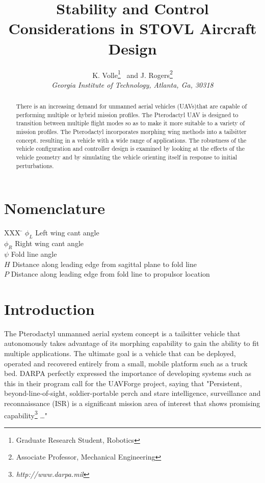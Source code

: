 \documentclass[]{aiaa-tc}%
\title{Stability and Control Considerations in STOVL Aircraft Design}
\author{
  K. Volle\footnote{Graduate Research Student, Robotics}%
  \ and J. Rogers\footnote{Associate Professor, Mechanical Engineering}\\%
  {\normalsize\itshape
   Georgia Institute of Technology, Atlanta, Ga, 30318}\\
 }
\begin{document}
\maketitle

\begin{abstract}
There is an increasing demand for unmanned aerial vehicles (UAVs)that are capable of performing multiple or hybrid mission profiles.  The Pterodactyl UAV is designed to transition between multiple flight modes so as to make it more suitable to a variety of mission profiles. The Pterodactyl incorporates morphing wing methods into a tailsitter concept. resulting in a vehicle with a wide range of applications. The robustness of the vehicle configuration and controller design is examined by looking at the effects of the vehicle geometry and by simulating the vehicle orienting itself in response to initial perturbations.
\end{abstract}

\section*{Nomenclature}



\begin{tabbing}
  XXX \= \kill%
\centering
  $ \phi_{L} $ \> Left wing cant angle \\
  $ \phi_{R} $ \> Right wing cant angle \\
  $ \psi $ \> Fold line angle \\
  $ H $ \> Distance along leading edge from sagittal plane to fold line  \\
  $ P $ \> Distance along leading edge from fold line to propulsor location \\

 \end{tabbing}
\section{Introduction}

The Pterodactyl unmanned aerial system concept is a tailsitter \cite{Forshaw:2012} vehicle that autonomously takes advantage of its morphing capability to gain the ability to fit multiple applications. The ultimate goal is a vehicle that can be deployed, operated and recovered entirely from a small, mobile platform such as a truck bed.
DARPA perfectly expressed the importance of developing systems such as this in their program call for the UAVForge project, saying that "Persistent, beyond-line-of-sight, soldier-portable perch and stare intelligence, surveillance and reconnaissance (ISR) is a significant mission area of interest that shows promising capability\footnote{\textit{http://www.darpa.mil}} \ldots  "
\end{document}
